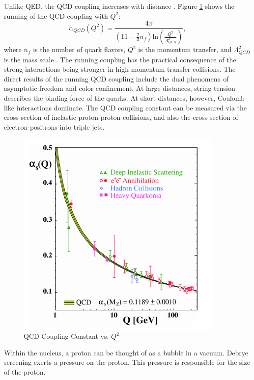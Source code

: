 Unlike QED, the QCD coupling increases with distance \cite{Bethke:2006ac}. Figure \ref{fig:runningQCDCoupling} shows the running of the QCD coupling with $Q^2$:
\begin{equation}
\alpha_{QCD}(Q^2) = \frac{4 \pi }{(11 - \frac{2}{3}n_f)\mathrm{ln}(\frac{Q^2}{\Lambda^2_{QCD}}) } ,
\end{equation}
where $n_f$ is the number of quark flavors, $Q^2$ is the momentum transfer, and  $\Lambda^2_{QCD}$ is the mass scale \cite{Deur:2016tte}. The running coupling has the practical consequence of the strong-interactions being stronger in high momentum transfer collisions. The direct results of the running QCD coupling include the dual phenomena of asymptotic freedom and color confinement. At large distances, string tension describes the binding force of the quarks. At short distances, however, Coulomb-like interactions dominate. The QCD coupling constant can be measured via the cross-section of inelastic proton-proton collisions, and also the cross section of electron-positrons into triple jets. 
\begin{figure}[h!]
\begin{centering}
\includegraphics[width=4in]{Chapter1/importfigs/qcd_coupling_bethke.png}
\par\end{centering}
\caption{QCD Coupling Constant vs. $Q^2$ \cite{Bethke:2006ac} \label{fig:runningQCDCoupling}}
\end{figure}

Within the nucleus, a proton can be thought of as a bubble in a vacuum. Debrye screening exerts a pressure on the proton. This pressure is responsible for the size of the proton.

